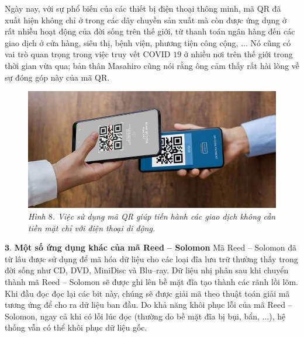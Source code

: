 \begin{multicols}{2}
\begin{figure}[H]
		\vspace*{-10pt}
	\end{figure}
	Ngày nay, với sự phổ biến của các thiết bị điện thoại thông minh, mã QR đã xuất hiện không chỉ ở trong các dây chuyền sản xuất mà còn được ứng dụng ở rất nhiều hoạt động của đời sống trên thế giới, từ thanh toán ngân hàng đến các giao dịch ở cửa hàng, siêu thị, bệnh viện, phương tiện công cộng, ... Nó cũng có vai trò quan trọng trong việc truy vết COVID $19$ ở nhiều nơi trên thế giới trong thời gian vừa qua; bản thân Masahiro cũng nói rằng ông cảm thấy rất hài lòng về sự đóng góp này của mã QR.
	\begin{figure}[H]
		\vspace*{-5pt}
		\centering
		\captionsetup{labelformat= empty, justification=centering}
		\includegraphics[width= 1\linewidth]{16}
		\caption{\small\textit{\color{toanhocdoisong}Hình $8$. Việc sử dụng mã QR giúp tiến hành các giao dịch không cần tiền mặt chỉ với điện thoại di động.}}
		\vspace*{-10pt}
	\end{figure}
	$\pmb{3.}$ \textbf{\color{toanhocdoisong}\color{toanhocdoisong}Một số ứng dụng khác của mã Reed -- Solomon}
	\vskip 0.05cm
	Mã Reed -- Solomon đã từ lâu được sử dụng để mã hóa dữ liệu cho các loại đĩa lưu trữ thường thấy trong đời sống như CD, DVD, MiniDisc và Blu--ray. Dữ liệu nhị phân sau khi chuyển thành mã Reed -- Solomon sẽ được ghi lên bề mặt đĩa tạo thành các rãnh lồi lõm. Khi đầu đọc đọc lại các bit này, chúng sẽ được giải mã theo thuật toán giải mã tương ứng để cho ra dữ liệu ban đầu. Do khả năng khôi phục lỗi của mã Reed -- Solomon, ngay cả khi có lỗi lúc đọc (thường do bề mặt đĩa bị bụi, bẩn, ...), hệ thống vẫn có thể khôi phục dữ liệu gốc.
	\begin{figure}[H]
		\vspace*{-5pt}
		\centering
		\captionsetup{labelformat= empty, justification=centering}

\end{figure}
\end{multicols}
